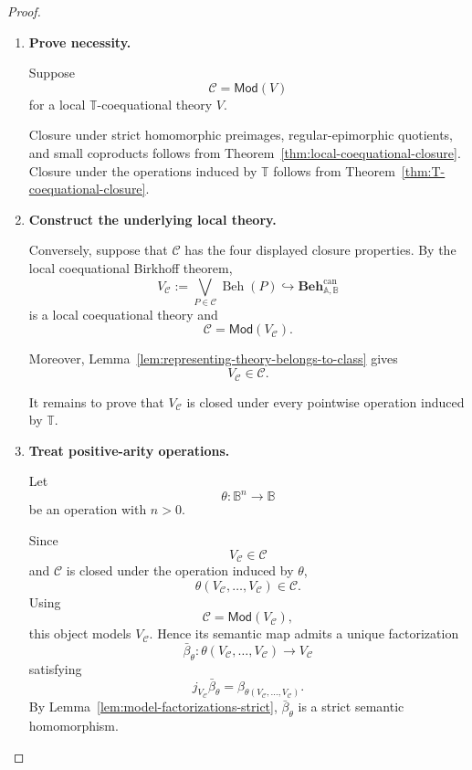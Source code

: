 \begin{proof}
    \leavevmode
    \begin{enumerate}
        \item \textbf{Prove necessity.}

        Suppose
        \[
            \mathcal C=\mathsf{Mod}(V)
        \]
        for a local \(\mathbb T\)-coequational theory \(V\).

        Closure under strict homomorphic preimages, regular-epimorphic
        quotients, and small coproducts follows from
        Theorem~\ref{thm:local-coequational-closure}. Closure under the
        operations induced by \(\mathbb T\) follows from
        Theorem~\ref{thm:T-coequational-closure}.

        \item \textbf{Construct the underlying local theory.}

        Conversely, suppose that \(\mathcal C\) has the four displayed
        closure properties. By the local coequational Birkhoff theorem,
        \[
            V_{\mathcal C}
            :=
            \bigvee_{P\in\mathcal C}
            \operatorname{Beh}(P)
            \hookrightarrow
            \mathbf{Beh}^{\mathrm{can}}_{\mathbb A,\mathbb B}
        \]
        is a local coequational theory and
        \[
            \mathcal C
            =
            \mathsf{Mod}(V_{\mathcal C}).
        \]

        Moreover,
        Lemma~\ref{lem:representing-theory-belongs-to-class} gives
        \[
            V_{\mathcal C}\in\mathcal C.
        \]

        It remains to prove that \(V_{\mathcal C}\) is closed under every
        pointwise operation induced by \(\mathbb T\).

        \item \textbf{Treat positive-arity operations.}

        Let
        \[
            \theta:\mathbb B^n\to\mathbb B
        \]
        be an operation with \(n>0\).

        Since
        \[
            V_{\mathcal C}\in\mathcal C
        \]
        and \(\mathcal C\) is closed under the operation induced by
        \(\theta\),
        \[
            \theta(
                V_{\mathcal C},
                \dots,
                V_{\mathcal C}
            )
            \in
            \mathcal C.
        \]
        Using
        \[
            \mathcal C
            =
            \mathsf{Mod}(V_{\mathcal C}),
        \]
        this object models \(V_{\mathcal C}\). Hence its semantic map admits
        a unique factorization
        \[
            \bar\beta_\theta:
            \theta(
                V_{\mathcal C},
                \dots,
                V_{\mathcal C}
            )
            \longrightarrow
            V_{\mathcal C}
        \]
        satisfying
        \[
            j_{V_{\mathcal C}}\bar\beta_\theta
            =
            \beta_{
                \theta(
                    V_{\mathcal C},
                    \dots,
                    V_{\mathcal C}
                )
            }.
        \]
        By Lemma~\ref{lem:model-factorizations-strict},
        \(\bar\beta_\theta\) is a strict semantic homomorphism.


\end{enumerate}
\end{proof}
